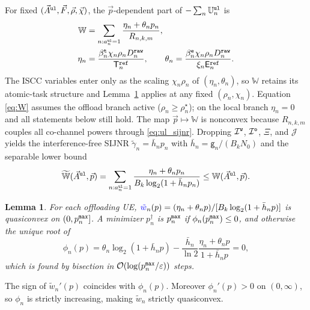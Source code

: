 \documentclass[journal]{IEEEtran}
\newtheorem{lemma}{Lemma}
\begin{document}
For fixed $(\vec{A}^{\tt ul},\vec{F},\vec{\rho},\vec{\chi})$, the $\vec{p}$-dependent part of $-\sum_n\mathbb{U}_n^{\tt ul}$ is
\begin{align}
\mathbb{W}
&=\sum_{n:a_n^{\tt ul}=1}
\frac{\eta_n+\theta_n p_n}{R_{n,k,m}},
\label{eq:W}\\
\eta_n&=\frac{\beta_n^{\tt t}\chi_n\rho_n D_n^{\tt raw}}{\mathsf{T}_n^{\tt ref}},
\qquad
\theta_n=\frac{\beta_n^{\tt e}\chi_n\rho_n D_n^{\tt raw}}{\xi_n\mathsf{E}_n^{\tt ref}}.
\nonumber
\end{align}
The ISCC variables enter only as the scaling $\chi_n\rho_n$ of $(\eta_n,\theta_n)$, so $\mathbb{W}$ retains its atomic-task structure and Lemma~\ref{lem:quasi} applies at any fixed $(\rho_n,\chi_n)$. Equation \eqref{eq:W} assumes the offload branch active ($\rho_n\ge\rho_n^\star$); on the local branch $\eta_n=0$ and all statements below still hold.
The map $\vec{p}\mapsto\mathbb{W}$ is nonconvex because $R_{n,k,m}$ couples all co-channel powers through \eqref{eq:ul_sijnr}. Dropping $\mathcal{I}^{\tt w}$, $\mathcal{I}^{\tt o}$, $\Xi$, and $\mathcal{J}$ yields the interference-free SIJNR $\tilde\gamma_{n}= \bar h_n p_n$ with $\bar h_n=\mathsf{g}_n/(B_k N_0)$ and the separable lower bound
\begin{equation}
\widetilde{\mathbb{W}}(\vec{A}^{\tt ul},\vec{p})
=\sum_{n:a_n^{\tt ul}=1}
\frac{\eta_n+\theta_n p_n}{B_k\log_2(1+\bar h_n p_n)}
\le \mathbb{W}(\vec{A}^{\tt ul},\vec{p}).
\label{eq:Wtil}
\end{equation}

\begin{lemma}\label{lem:quasi}
For each offloading UE, ${\color{blue}\tilde{w}}_n(p)=(\eta_n+\theta_n p)/[B_k\log_2(1+\bar h_n p)]$ is quasiconvex on $(0,p_n^{\tt max}]$. A minimizer $p_n^\dagger$ is $p_n^{\tt max}$ if $\phi_n(p_n^{\tt max})\le 0$, and otherwise the unique root of
\begin{equation}
\phi_n(p)
=\theta_n\log_2(1+\bar h_n p)
-\frac{\bar h_n}{\ln 2}\frac{\eta_n+\theta_n p}{1+\bar h_n p}=0,
\label{eq:phi}
\end{equation}
which is found by bisection in $\mathcal{O}(\log(p_n^{\tt max}/\varepsilon))$ steps.
\end{lemma}
\begin{IEEEproof}
The sign of $\tilde{w}_n'(p)$ coincides with $\phi_n(p)$. 
{\color{blue}Moreover $\phi_n'(p)>0$ on $(0,\infty)$, so $\phi_n$ is strictly increasing, making $\tilde{w}_n$ strictly quasiconvex.}
\end{IEEEproof}
\end{document}
